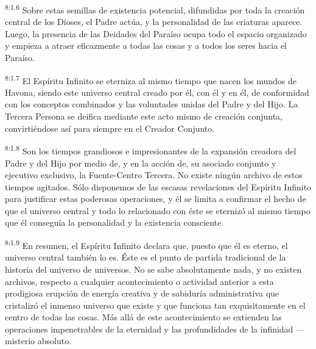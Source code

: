 \par
\textsuperscript{8:1.6} Sobre estas semillas de existencia potencial, difundidas por toda la creación central de los Dioses, el Padre actúa, y la personalidad de las criaturas aparece. Luego, la presencia de las Deidades del Paraíso ocupa todo el espacio organizado y empieza a atraer eficazmente a todas las cosas y a todos los seres hacia el Paraíso.

\par
\textsuperscript{8:1.7} El Espíritu Infinito se eterniza al mismo tiempo que nacen los mundos de Havona, siendo este universo central creado por él, con él y en él, de conformidad con los conceptos combinados y las voluntades unidas del Padre y del Hijo. La Tercera Persona se deifica mediante este acto mismo de creación conjunta, convirtiéndose así para siempre en el Creador Conjunto.

\par
\textsuperscript{8:1.8} Son los tiempos grandiosos e impresionantes de la expansión creadora del Padre y del Hijo por medio de, y en la acción de, su asociado conjunto y ejecutivo exclusivo, la Fuente-Centro Tercera. No existe ningún archivo de estos tiempos agitados. Sólo disponemos de las escasas revelaciones del Espíritu Infinito para justificar estas poderosas operaciones, y él se limita a confirmar el hecho de que el universo central y todo lo relacionado con éste se eternizó al mismo tiempo que él conseguía la personalidad y la existencia consciente.

\par
\textsuperscript{8:1.9} En resumen, el Espíritu Infinito declara que, puesto que él es eterno, el universo central también lo es. Éste es el punto de partida tradicional de la historia del universo de universos. No se sabe absolutamente nada, y no existen archivos, respecto a cualquier acontecimiento o actividad anterior a esta prodigiosa erupción de energía creativa y de sabiduría administrativa que cristalizó el inmenso universo que existe y que funciona tan exquisitamente en el centro de todas las cosas. Más allá de este acontecimiento se extienden las operaciones impenetrables de la eternidad y las profundidades de la infinidad ---misterio absoluto.

